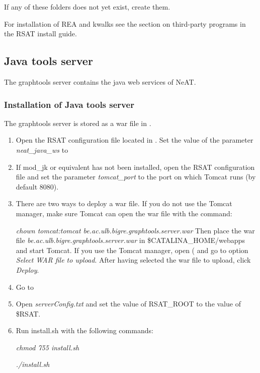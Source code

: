 \documentclass{book}
\begin{document}





If any of these folders does not yet exist, create them.

For installation of REA and kwalks see the section on third-party programs in
the RSAT install guide.

\subsection{Java tools server}

The graphtools server contains the java web services of NeAT.

\subsubsection{Installation of Java tools server}

The graphtools server is stored as a war file in .

\begin{enumerate}

\item Open the RSAT configuration file
 located in .
Set the value of the parameter \textit{neat\_java\_ws}
to 

\item If mod\_jk or equivalent has not been installed,
open the RSAT configuration file and set the parameter
\textit{tomcat\_port} to the port on which Tomcat runs (by default 8080).

\item There are two ways to deploy a war file.
 If you do not use the Tomcat manager, make sure
 Tomcat can open the war file with the command:

 \textit{chown tomcat:tomcat be.ac.ulb.bigre.graphtools.server.war}
 Then place the war file \textit{be.ac.ulb.bigre.graphtools.server.war} in
 \$CATALINA\_HOME/webapps and start Tomcat.
 If you use the Tomcat manager, open
 ( and go to option \textit{Select WAR file to upload}.
 After having selected the war file to upload, click \textit{Deploy}.

\item Go to 

\item Open \textit{serverConfig.txt} and set the value of RSAT\_ROOT to the value of \$RSAT.

\item Run install.sh with the following commands:

	  \textit{chmod 755 install.sh}

      \textit{./install.sh}

\end{enumerate}
\end{document}
